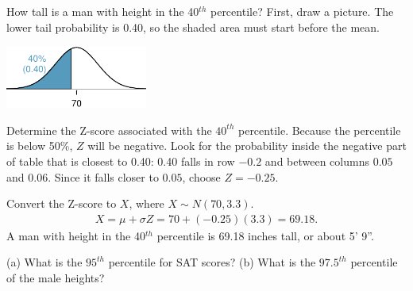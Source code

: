 \textD{\newpage}

\begin{examplewrap}
\begin{nexample}{How tall is a man with height in the 40$^{th}$ percentile?}\label{normalExam40Perc}
First, draw a picture. The lower tail probability is 0.40, so the shaded area must start before the mean. \vspace{-1mm}
\begin{center}
\includegraphics[width=0.35\textwidth]{ch_distributions_oi_biostat/figures/height40Perc/height40Perc}\vspace{-1mm}
\end{center}

Determine the Z-score associated with the $40^{th}$ percentile. Because the percentile is below 50\%, $Z$ will be negative. Look for the probability inside the negative part of table that is closest to 0.40: 0.40 falls in row $-0.2$ and between columns $0.05$ and $0.06$. Since it falls closer to $0.05$, choose $Z=-0.25$.

Convert the Z-score to $X$, where $X \sim N(70, 3.3)$. 
\begin{align*}
X = \mu + \sigma Z = 70 + (-0.25)(3.3) = 69.18.
\end{align*}
A man with height in the 40$^{th}$ percentile is 69.18 inches tall, or about 5' 9''. 
\end{nexample}
\end{examplewrap}

\begin{exercisewrap}
\begin{nexercise}
(a) What is the $95^{th}$ percentile for SAT scores? (b) What is the $97.5^{th}$ percentile of the male heights?\footnotemark{}
\end{nexercise}
\end{exercisewrap}


\textD{\newpage}



